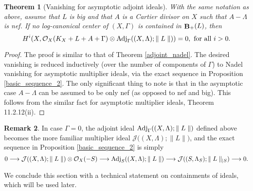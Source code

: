 \documentclass[11pt]{amsart}
\theoremstyle{plain}
\newtheorem{theorem}{Theorem}[section]
\theoremstyle{definition}
\newtheorem{remark}[theorem]{Remark}
\newcommand{\OO}{\mathcal  {O}}
\newcommand{\JJ}{\mathcal  {J}}
\newcommand{\Adj}{{\rm Adj}}
\DeclareMathOperator{\BB}{{\bf B}}
\begin{document}
\begin{theorem}[Vanishing for asymptotic adjoint ideals]\label{asymptotic_nadel}
With the same notation as above, assume that $L$ is big and that $A$ is a Cartier divisor on $X$ such that $A - \Lambda$ is nef.  If no log-canonical center of $(X, \Gamma)$ is contained in $\BB_{+} (L)$, then 
$$H^i (X, \OO_X(K_X + L  + A + \Gamma)\otimes \Adj_{\Gamma} ((X, \Lambda); \parallel L \parallel)) = 0,  {\rm~for~all~} i>0.$$
\end{theorem}
\begin{proof}
The proof is similar to that of Theorem \ref{adjoint_nadel}. The desired vanishing is reduced inductively 
(over the number of components of $\Gamma$) to Nadel vanishing for asymptotic multiplier ideals, via the 
exact sequence in Proposition \ref{basic_sequence_2}. The only significant thing to note is that in the 
asymptotic case $A - \Lambda$ can be assumed to be only nef (as opposed to nef and big). This follows from the similar fact for asymptotic multiplier ideals, \cite{positivity} Theorem 11.2.12(ii).
\end{proof}

\begin{remark}\label{no_restriction} 
In case $\Gamma = 0$, the adjoint ideal $\Adj_{\Gamma} ((X, \Lambda); \parallel L \parallel)$
defined above becomes the more familiar multiplier ideal $\JJ\big( ( X, \Lambda); \parallel L \parallel \big)$, and the exact sequence in Proposition \ref{basic_sequence_2} is simply
$$0 \longrightarrow \JJ ( (X, \Lambda); \parallel L \parallel) \otimes \OO_X(-S) \longrightarrow 
\Adj_S ((X, \Lambda);  \parallel L \parallel) \longrightarrow 
\JJ ( (S, \Lambda_S); \parallel L \parallel_{|S})\longrightarrow 0.$$
\end{remark} 


We conclude this section with a technical statement on containments of ideals, which will be used later.
\end{document}

